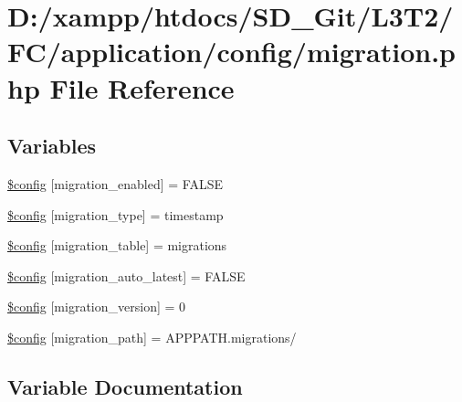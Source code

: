\hypertarget{application_2config_2migration_8php}{}\section{D\+:/xampp/htdocs/\+S\+D\+\_\+\+Git/\+L3\+T2/\+F\+C/application/config/migration.php File Reference}
\label{application_2config_2migration_8php}
\subsection*{Variables}
\begin{DoxyCompactItemize}
\item 
\hyperlink{application_2config_2migration_8php_ad6392796c28d7391c3977c2cceef3cc2}{\$config} \mbox{[}\textquotesingle{}migration\+\_\+enabled\textquotesingle{}\mbox{]} = F\+A\+L\+S\+E
\item 
\hyperlink{application_2config_2migration_8php_ad5a6eb0992227e3fabe3576b61467f11}{\$config} \mbox{[}\textquotesingle{}migration\+\_\+type\textquotesingle{}\mbox{]} = \textquotesingle{}timestamp\textquotesingle{}
\item 
\hyperlink{application_2config_2migration_8php_ab6c0facc32c2cc46aa003a67bd841703}{\$config} \mbox{[}\textquotesingle{}migration\+\_\+table\textquotesingle{}\mbox{]} = \textquotesingle{}migrations\textquotesingle{}
\item 
\hyperlink{application_2config_2migration_8php_ad90ceba960297b62c14da775e8c0c7db}{\$config} \mbox{[}\textquotesingle{}migration\+\_\+auto\+\_\+latest\textquotesingle{}\mbox{]} = F\+A\+L\+S\+E
\item 
\hyperlink{application_2config_2migration_8php_a53ca48939aaf8c92f0c0d239a294fff2}{\$config} \mbox{[}\textquotesingle{}migration\+\_\+version\textquotesingle{}\mbox{]} = 0
\item 
\hyperlink{application_2config_2migration_8php_abc04383313304e348060a7ee39f5a8ee}{\$config} \mbox{[}\textquotesingle{}migration\+\_\+path\textquotesingle{}\mbox{]} = A\+P\+P\+P\+A\+T\+H.\textquotesingle{}migrations/\textquotesingle{}
\end{DoxyCompactItemize}


\subsection{Variable Documentation}
\hypertarget{application_2config_2migration_8php_ad6392796c28d7391c3977c2cceef3cc2}{}
